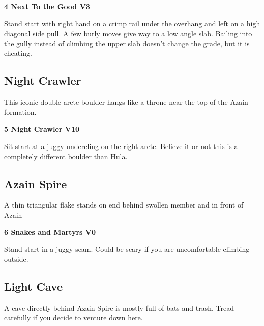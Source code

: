 \begin{multicols}{2}
					\label{rt:Next To the Good}
\colorbox{green!20}{
\parbox{0.95\linewidth}{
\textbf{
4 Next To the Good V3   \warn 
}
}
}

					\begin{adjustwidth}{0.5cm}{}				
					Stand start with right hand on a crimp rail under the overhang and left on a high diagonal side pull. A few burly moves give way to a low angle slab. Bailing into the gully instead of climbing the upper slab doesn't change the grade, but it is cheating.
					\end{adjustwidth}
			\subsection*{Night Crawler}\label{bf:Night Crawler}
			This iconic double arete boulder hangs like a throne near the top of the Azain formation.\\
			

					\label{rt:Night Crawler}
\colorbox{red!20}{
\parbox{0.95\linewidth}{
\textbf{
5 Night Crawler V10    
}
}
}

					\begin{adjustwidth}{0.5cm}{}				
					Sit start at a juggy undercling on the right arete. Believe it or not this is a completely different boulder than Hula.
					\end{adjustwidth}
			\subsection*{Azain Spire}\label{bf:Azain Spire}
			A thin triangular flake stands on end behind swollen member and in front of Azain\\
			

					\label{rt:Snakes and Martyrs}
\colorbox{green!20}{
\parbox{0.95\linewidth}{
\textbf{
6 Snakes and Martyrs V0     
}
}
}

					\begin{adjustwidth}{0.5cm}{}				
					 Stand start in a juggy seam. Could be scary if you are uncomfortable climbing outside.
					\end{adjustwidth}
			\subsection*{Light Cave}\label{bf:Light Cave}
			A cave directly behind Azain Spire is mostly full of bats and trash. Tread carefully if you decide to venture down here.\\
			

\end{multicols}
